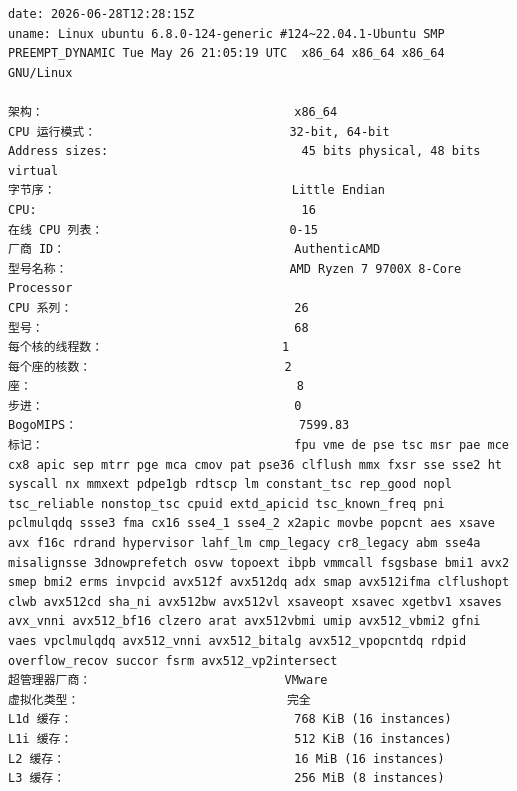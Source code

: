 \begin{verbatim}
date: 2026-06-28T12:28:15Z
uname: Linux ubuntu 6.8.0-124-generic #124~22.04.1-Ubuntu SMP PREEMPT_DYNAMIC Tue May 26 21:05:19 UTC  x86_64 x86_64 x86_64 GNU/Linux

架构：                                   x86_64
CPU 运行模式：                           32-bit, 64-bit
Address sizes:                           45 bits physical, 48 bits virtual
字节序：                                 Little Endian
CPU:                                     16
在线 CPU 列表：                          0-15
厂商 ID：                                AuthenticAMD
型号名称：                               AMD Ryzen 7 9700X 8-Core Processor
CPU 系列：                               26
型号：                                   68
每个核的线程数：                         1
每个座的核数：                           2
座：                                     8
步进：                                   0
BogoMIPS：                               7599.83
标记：                                   fpu vme de pse tsc msr pae mce cx8 apic sep mtrr pge mca cmov pat pse36 clflush mmx fxsr sse sse2 ht syscall nx mmxext pdpe1gb rdtscp lm constant_tsc rep_good nopl tsc_reliable nonstop_tsc cpuid extd_apicid tsc_known_freq pni pclmulqdq ssse3 fma cx16 sse4_1 sse4_2 x2apic movbe popcnt aes xsave avx f16c rdrand hypervisor lahf_lm cmp_legacy cr8_legacy abm sse4a misalignsse 3dnowprefetch osvw topoext ibpb vmmcall fsgsbase bmi1 avx2 smep bmi2 erms invpcid avx512f avx512dq adx smap avx512ifma clflushopt clwb avx512cd sha_ni avx512bw avx512vl xsaveopt xsavec xgetbv1 xsaves avx_vnni avx512_bf16 clzero arat avx512vbmi umip avx512_vbmi2 gfni vaes vpclmulqdq avx512_vnni avx512_bitalg avx512_vpopcntdq rdpid overflow_recov succor fsrm avx512_vp2intersect
超管理器厂商：                           VMware
虚拟化类型：                             完全
L1d 缓存：                               768 KiB (16 instances)
L1i 缓存：                               512 KiB (16 instances)
L2 缓存：                                16 MiB (16 instances)
L3 缓存：                                256 MiB (8 instances)
\end{verbatim}
